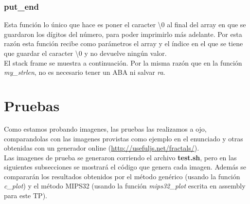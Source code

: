 \documentclass[a4paper,10pt]{article}
\begin{document}
\begin{center}
\begin{drawstack}
	\startframe
	 
	 
	 
	 
	\startframe
	 
	 
	\startframe
	 
	 
	 
	 
\end{drawstack}
\end{center}

\subsubsection{put\_end}
Esta función lo único que hace es poner el caracter \textbackslash0 al final del array en que se guardaron los dígitos del número, para poder imprimirlo más adelante. Por esta razón esta función recibe como parámetros el array y el índice en el que se tiene que guardar el caracter \textbackslash0 y no devuelve ningún valor. \\
El stack frame se muestra a continuación. Por la misma razón que en la función \textit{my\_strlen}, no es necesario tener un ABA ni salvar \textit{ra}.

\begin{center}
\begin{drawstack}
	\startframe
	 
	 
\end{drawstack}
\end{center}

\section{Pruebas}
Como estamos probando imagenes, las pruebas las realizamos a ojo, comparandolas con las imagenes provistas como ejemplo en el enunciado y otras obtenidas con un generador online (\url{http://usefuljs.net/fractals/}). \\
Las imagenes de prueba se generaron corriendo el archivo \textbf{test.sh}, pero en las siguientes subsecciones se mostrará el código que genera cada imagen. Además se compararán los resultados obtenidos por el método genérico (usando la función \textit{c\_plot}) y el método MIPS32 (usando la función \textit{mips32\_plot} escrita en assembly para este TP).

\end{document}
